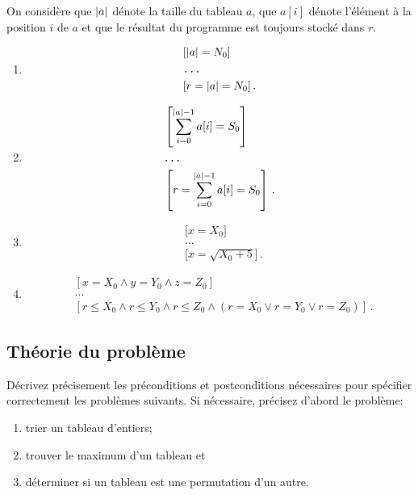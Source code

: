 \begin{solution}
On considère que $\left\lvert a\right\lvert$ dénote la taille du tableau $a$,
que $a[i]$ dénote l'élément à la position $i$ de $a$
et que le résultat du programme est toujours stocké dans $r$.
\begin{enumerate}[label={\textbf{\alph*.}}]
	\item
	\begin{align*}
		&[\left\lvert a\right\lvert = N_0] \\
		&\texttt{...} \\
		&[r = \left\lvert a\right\lvert = N_0]\,.
	\end{align*}
	\item
	\begin{align*}
		&\left[\sum_{i=0}^{\left\lvert a\right\lvert - 1} a[i] = S_0\right] \\
		&\texttt{...} \\
		&\left[r = \sum_{i=0}^{\left\lvert a\right\lvert - 1} a[i] = S_0\right]\,.
	\end{align*}
	\item
	\begin{align*}
		&\Big[x = X_0\Big] \\
		&\texttt{...} \\
		&\Big[x = \sqrt{X_0 + 5}\Big]\,.
	\end{align*}
	\item
	\begin{align*}
		&[x = X_0 \land y = Y_0 \land z = Z_0] \\
		&\texttt{...} \\
		&[r \le X_0 \land r \le Y_0 \land r \le Z_0 \land (r = X_0 \lor r = Y_0 \lor r = Z_0)]\,.
	\end{align*}
\end{enumerate}
\end{solution}

\subsection{Théorie du problème}
Décrivez précisement les préconditions et postconditions nécessaires
pour spécifier correctement les problèmes suivants.
Si nécessaire, précisez d'abord le problème:
\begin{enumerate}[label={\textbf{\alph*.}}]
	\item trier un tableau d'entiers;
	\item trouver le maximum d'un tableau et
	\item déterminer si un tableau est une permutation d'un autre.
\end{enumerate}

